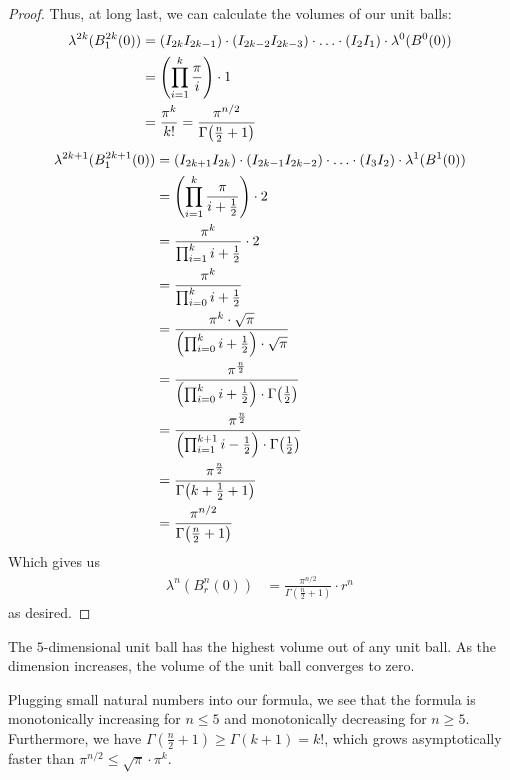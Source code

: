 \begin{proof}
	Thus, at long last, we can calculate the volumes of our unit balls:
	\begin{align*}
		\lambda^{2k}(B^{2k}_1(0)) 
		&= (I_{2k}I_{2k-1}) \cdot (I_{2k - 2}I_{2k-3}) \cdot \hdots \cdot (I_2 I_1) \cdot \lambda^0(B^0(0))\\
		&= \qty(\prod_{i = 1}^k \frac{\pi}{i}) \cdot 1\\
		&= \frac{\pi^k}{k!} = \frac{\pi^{n/2}}{\Gamma\qty(\frac{n}{2} + 1)}
	\end{align*}
	\begin{align*}
		\lambda^{2k+1}(B^{2k+1}_1(0)) 
		&= (I_{2k+1}I_{2k}) \cdot (I_{2k - 1}I_{2k-2}) \cdot \hdots \cdot (I_3 I_2) \cdot \lambda^1(B^1(0))\\
		&= \qty(\prod_{i = 1}^k \frac{\pi}{i + \frac{1}{2}}) \cdot 2\\
		&= \frac{\pi^k}{\prod_{i = 1}^k i + \frac{1}{2}} \cdot 2\\
		&= \frac{\pi^k}{\prod_{i = 0}^k i + \frac{1}{2}}\\
		&= \frac{\pi^k \cdot \sqrt{\pi}}{\qty(\prod_{i = 0}^k i + \frac{1}{2}) \cdot \sqrt{\pi}}\\
		&= \frac{\pi^\frac{n}{2}}{\qty(\prod_{i = 0}^k i + \frac{1}{2}) \cdot \Gamma\qty(\frac{1}{2})}\\
		&= \frac{\pi^\frac{n}{2}}{\qty(\prod_{i = 1}^{k+1} i - \frac{1}{2}) \cdot \Gamma\qty(\frac{1}{2})}\\
		&= \frac{\pi^\frac{n}{2}}{\Gamma\qty(k + \frac{1}{2} + 1)}\\
		&= \frac{\pi^{n/2}}{\Gamma\qty(\frac{n}{2} + 1)}
	\end{align*}
	Which gives us
	\begin{align*}
		\lambda^n(B^n_r(0))
		&=
		\frac{\pi^{n/2}}{\Gamma(\frac{n}{2}+1)} \cdot r^n
	\end{align*}
	as desired.
\end{proof}
\begin{proposition}
	The $5$-dimensional unit ball has the highest volume out of any unit ball. As the dimension increases, the volume of the unit ball converges to zero.  
\end{proposition}
\begin{proofsketch}
	Plugging small natural numbers into our formula, we see that the formula is monotonically increasing for $n \leq 5$ and monotonically decreasing for $n \geq 5$. Furthermore, we have $\Gamma(\frac{n}{2} + 1) \geq \Gamma(k + 1) = k!$, which grows asymptotically faster than $\pi^{n/2} \leq \sqrt{\pi} \cdot \pi^k$.
\end{proofsketch}
